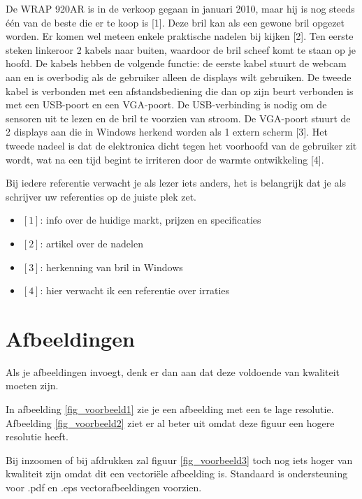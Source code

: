 De WRAP 920AR is in de verkoop gegaan in januari 2010, maar hij is nog steeds \'e\'en van de beste 
die er te koop is [1]. 
Deze bril kan als een gewone bril opgezet worden. Er komen wel meteen enkele praktische
nadelen bij kijken [2]. Ten eerste steken linkeroor 2 kabels naar buiten, waardoor de bril scheef
komt te staan op je hoofd. De kabels hebben de volgende functie: de eerste kabel stuurt de
webcam aan en is overbodig als de gebruiker alleen de displays wilt gebruiken. De tweede kabel
is verbonden met een afstandsbediening die dan op zijn beurt verbonden is met een USB-poort
en een VGA-poort. De USB-verbinding is nodig om de sensoren uit te lezen en de bril te
voorzien van stroom. De VGA-poort stuurt de 2 displays aan die in Windows herkend worden
als 1 extern scherm [3]. Het tweede nadeel is dat de elektronica dicht tegen het voorhoofd van de
gebruiker zit wordt, wat na een tijd begint te irriteren door de warmte ontwikkeling [4].

Bij iedere referentie verwacht je als lezer iets anders, het is belangrijk dat je als schrijver uw referenties op de juiste plek zet.

\begin{itemize}
 \item $[1]$: info over de huidige markt, prijzen en specificaties
 \item $[2]$: artikel over de nadelen
 \item $[3]$: herkenning van bril in Windows
 \item $[4]$: hier verwacht ik een referentie over irraties
\end{itemize}

\section{Afbeeldingen}

Als je afbeeldingen invoegt, denk er dan aan dat deze voldoende van kwaliteit moeten zijn.

In afbeelding \ref{fig_voorbeeld1} zie je een afbeelding met een te lage resolutie. Afbeelding \ref{fig_voorbeeld2} ziet er al beter uit omdat deze figuur een hogere resolutie heeft.

Bij inzoomen of bij afdrukken zal figuur \ref{fig_voorbeeld3} toch nog iets hoger van kwaliteit zijn omdat dit een vectori\"ele afbeelding is. 
Standaard is ondersteuning voor .pdf en .eps vectorafbeeldingen voorzien.

